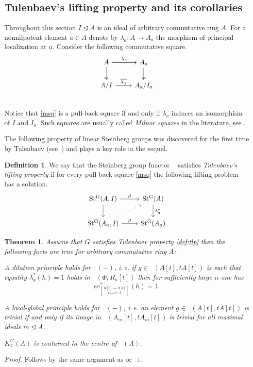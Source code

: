 \documentclass[oneside,12pt]{amsart}
\newtheorem{thm}{Theorem}
\numberwithin{equation}{section}
\numberwithin{lem}{section}
\theoremstyle{definition}
\newtheorem{dfn}[lem]{Definition}
\theoremstyle{remark}
\DeclareMathOperator{\St}{St^G}
\newcommand{\eval}[4]{ev_{\scriptstyle \left[\frac{#2[#1] \rightarrow #3}{#1 \mapsto #4}\right]}}
\newcommand{\ev}[3]{\eval{t}{#1}{#2}{#3}}
\begin{document}
\subsection{Tulenbaev's lifting property and its corollaries}
Throughout this section $I \trianglelefteq A$ is an ideal of arbitrary commutative ring $A$.
For a nonnilpotent element $a \in A$ denote by $\lambda_a\colon A \rightarrow A_a$ the morphism of principal localization at $a$.
Consider the following commutative square.
\begin{equation} \label{msq}
 \begin{tikzcd} 
    A \ar[r, "\lambda_a"] \ar[d, twoheadrightarrow] \ar[r] & A_a \ar[d, twoheadrightarrow] \\
    A/I \ar[r, "\overline{\lambda_a}"]& A_a/I_a\\
   \end{tikzcd}
\end{equation}
Notice that \eqref{msq} is a pull-back square if and only if $\lambda_a$ induces an isomorphism of $I$ and $I_a$.
Such squares are usually called \emph{Milnor squares} in the literature, see \cite[Ch.~I, \S~2]{Kbook}.

The following property of linear Steinberg groups was discovered for the first time by Tulenbaev 
(see~\cite[Lemmas 2.3, 3.2]{Tu}) and plays a key role in the sequel.
\begin{dfn} \label{def:tlp}
We say that the Steinberg group functor $\St$ satisfies {\it Tulenbaev's lifting property}
if for every pull-back square \eqref{msq} the following lifting problem has a solution.
\[\begin{tikzcd} \St(A,   I) \arrow[r, "\mu"] \arrow[d]          &  \St(A) \ar[d, "\lambda_a^*"] \\
                 \St(A_a, I) \arrow[r, "\mu"] \arrow[ur, dotted] &  \St(A_a) \end{tikzcd}\]
\end{dfn}

\begin{thm} Assume that $G$ satisfies Tulenbaev property \eqref{def:tlp} then the following facts are true for arbitrary commutative ring $A$:
\begin{thmlist}
 \item \label{thm:dp} A dilation principle holds for $\St(-)$, i.\,e. if $g\in\St(A[t], tA[t])$ is such that equality $\lambda_a^*(h) = 1$ holds in $\St(\Phi, R_a[t])$ then
       for sufficiently large $n$ one has $$\ev{R}{R[t]}{a^n\cdot t}^*(h) = 1.$$
 \item \label{thm:lg-k2} A local-global principle holds for $\St(-)$, i.\,e. an element $g \in \St(A[t], tA[t])$ is trivial if and only if its image in 
                         $\St(A_m[t], tA_m[t])$ is trivial for all maximal ideals $m \trianglelefteq A$.
 \item \label{thm:centr} $K_2^G(A)$ is contained in the centre of $\St(A)$.
\end{thmlist}


\end{thm}
\begin{proof} Follows by the same argument as \cite[Theorem~2.1]{Tu} or \cite[Theorem~2]{S15} \end{proof}
\end{document}
